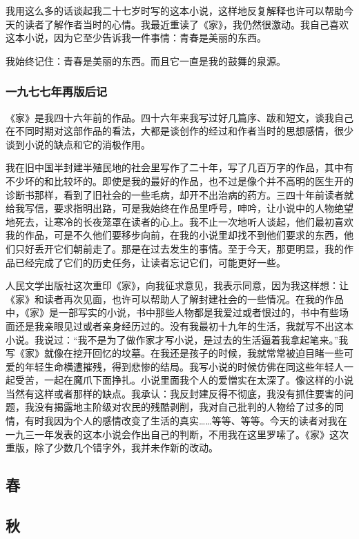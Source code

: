 \par 我用这么多的话谈起我二十七岁时写的这本小说，这样地反复解释也许可以帮助今天的读者了解作者当时的心情。我最近重读了《家》，我仍然很激动。我自己喜欢这本小说，因为它至少告诉我一件事情：青春是美丽的东西。
\par 我始终记住：青春是美丽的东西。而且它一直是我的鼓舞的泉源。
\par {}
\par {}


\subsubsection*{一九七七年再版后记}


\par 《家》是我四十六年前的作品。四十六年来我写过好几篇序、跋和短文，谈我自己在不同时期对这部作品的看法，大都是谈创作的经过和作者当时的思想感情，很少谈到小说的缺点和它的消极作用。
\par 我在旧中国半封建半殖民地的社会里写作了二十年，写了几百万字的作品，其中有不少坏的和比较坏的。即使是我的最好的作品，也不过是像个并不高明的医生开的诊断书那样，看到了旧社会的一些毛病，却开不出治病的药方。三四十年前读者就给我写信，要求指明出路，可是我始终在作品里呼号，呻吟，让小说中的人物绝望地死去，让寒冷的长夜笼罩在读者的心上。我不止一次地听人谈起，他们最初喜欢我的作品，可是不久他们要移步向前，在我的小说里却找不到他们要求的东西，他们只好丢开它们朝前走了。那是在过去发生的事情。至于今天，那更明显，我的作品已经完成了它们的历史任务，让读者忘记它们，可能更好一些。
\par 人民文学出版社这次重印《家》，向我征求意见，我表示同意，因为我这样想：让《家》和读者再次见面，也许可以帮助人了解封建社会的一些情况。在我的作品中，《家》是一部写实的小说，书中那些人物都是我爱过或者恨过的，书中有些场面还是我亲眼见过或者亲身经历过的。没有我最初十九年的生活，我就写不出这本小说。我说过：“我不是为了做作家才写小说，是过去的生活逼着我拿起笔来。”我写《家》就像在挖开回忆的坟墓。在我还是孩子的时候，我就常常被迫目睹一些可爱的年轻生命横遭摧残，得到悲惨的结局。我写小说的时候仿佛在同这些年轻人一起受苦，一起在魔爪下面挣扎。小说里面我个人的爱憎实在太深了。像这样的小说当然有这样或者那样的缺点。我承认：我反封建反得不彻底，我没有抓住要害的问题，我没有揭露地主阶级对农民的残酷剥削，我对自己批判的人物给了过多的同情，有时我因为个人的感情改变了生活的真实……等等、等等。今天的读者对我在一九三一年发表的这本小说会作出自己的判断，不用我在这里罗嗦了。《家》这次重版，除了少数几个错字外，我并未作新的改动。
\par {}
\par {}











\subsection{春}





\subsection{秋}




